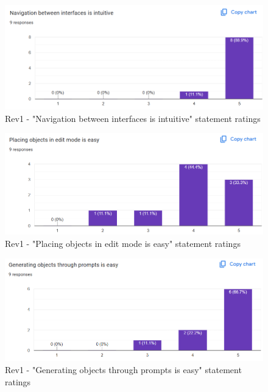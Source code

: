 \documentclass{article}
\begin{document}
\begin{figure}[H]
  \caption{Rev1 - "Navigation between interfaces is intuitive" statement ratings}
  \centerline{\includegraphics[scale=0.75]{./Survey_Images/Rev1/Q1.png}}
  \label{fig:StraightForward}
\end{figure}

\begin{figure}[H]
  \caption{Rev1 - "Placing objects in edit mode is easy" statement ratings}
  \centerline{\includegraphics[scale=0.75]{./Survey_Images/Rev1/Q2.png}}
  \label{fig:Navigation}
\end{figure}

\begin{figure}[H]
  \caption{Rev1 - "Generating objects through prompts is easy" statement ratings}
  \centerline{\includegraphics[scale=0.75]{./Survey_Images/Rev1/Q3.png}}
  \label{fig:Detached}
\end{figure}
\end{document}
